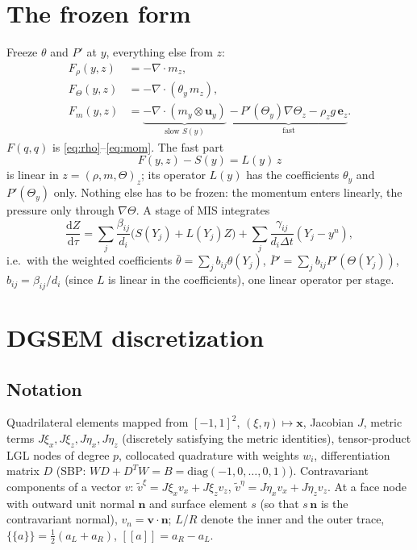 \documentclass[11pt,a4paper]{article}
\newcommand{\dt}{\Delta t}
\newcommand{\avg}[1]{\{\!\{#1\}\!\}}
\newcommand{\jump}[1]{[\![#1]\!]}
\begin{document}
\section{The frozen form}
Freeze $\theta$ and $P'$ at $y$, everything else from $z$:
\begin{align*}
F_\rho(y,z)&=-\nabla\cdot m_z,\\
F_\Theta(y,z)&=-\nabla\cdot(\theta_y\,m_z),\\
F_m(y,z)&=\underbrace{-\nabla\cdot(m_y\otimes\mathbf u_y)}_{\text{slow }S(y)}
\;\underbrace{-\,P'(\Theta_y)\nabla\Theta_z-\rho_z g\,\mathbf e_z}_{\text{fast}}.
\end{align*}
$F(q,q)$ is \eqref{eq:rho}--\eqref{eq:mom}. The fast part
\[
F(y,z)-S(y)=L(y)\,z
\]
is linear in $z=(\rho,m,\Theta)_z$; its operator $L(y)$ has the coefficients $\theta_y$ and $P'(\Theta_y)$
only. Nothing else has to be frozen: the momentum enters linearly, the pressure only through $\nabla\Theta$.
A stage of MIS integrates
\[
\frac{\mathrm dZ}{\mathrm d\tau}=\sum_j\frac{\beta_{ij}}{d_i}\big(S(Y_j)+L(Y_j)Z\big)+\sum_j\frac{\gamma_{ij}}{d_i\dt}(Y_j-y^n),
\]
i.e.\ with the weighted coefficients $\bar\theta=\sum_j b_{ij}\theta(Y_j)$, $\bar P'=\sum_j b_{ij}P'(\Theta(Y_j))$,
$b_{ij}=\beta_{ij}/d_i$ (since $L$ is linear in the coefficients), one linear operator per stage.

\section{DGSEM discretization}

\subsection{Notation}
Quadrilateral elements mapped from $[-1,1]^2$, $(\xi,\eta)\mapsto\mathbf x$, Jacobian $J$, metric terms
$J\xi_x, J\xi_z, J\eta_x, J\eta_z$ (discretely satisfying the metric identities), tensor-product LGL nodes of
degree $p$, collocated quadrature with weights $w_i$, differentiation matrix $D$ (SBP:
$WD+D^TW=B=\mathrm{diag}(-1,0,\dots,0,1)$). Contravariant components of a vector $v$:
$\tilde v^\xi=J\xi_x v_x+J\xi_z v_z$, $\tilde v^\eta=J\eta_x v_x+J\eta_z v_z$. At a face node with outward
unit normal $\mathbf n$ and surface element $s$ (so that $s\,\mathbf n$ is the contravariant normal),
$v_n=\mathbf v\cdot\mathbf n$; $L$/$R$ denote the inner and the outer trace, $\avg a=\tfrac12(a_L+a_R)$,
$\jump a=a_R-a_L$.
\end{document}
